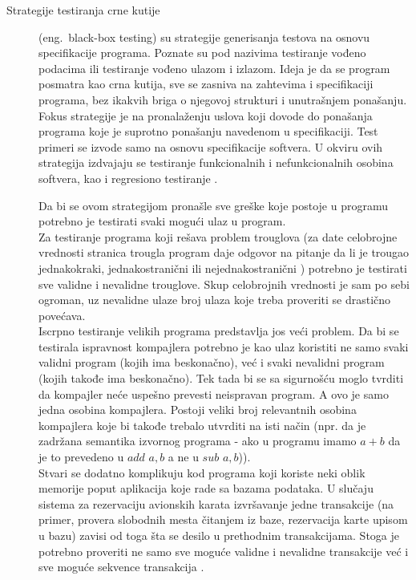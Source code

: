 \documentclass[12pt,oneside]{memoir}
\begin{document}
\begin{description}
\item [Strategije testiranja crne kutije] (eng.~black-box testing) su strategije generisanja testova na osnovu specifikacije programa. Poznate su pod nazivima testiranje vođeno podacima ili testiranje vođeno ulazom i izlazom. Ideja je da se program posmatra kao crna kutija, sve se zasniva na zahtevima i specifikaciji programa, bez ikakvih briga o njegovoj strukturi i unutrašnjem ponašanju. Fokus strategije je na pronalaženju uslova koji dovode do ponašanja programa koje je suprotno ponašanju navedenom u specifikaciji. Test primeri se izvode samo na osnovu specifikacije softvera. U okviru ovih strategija izdvajaju se testiranje funkcionalnih i nefunkcionalnih osobina softvera, kao i regresiono testiranje \cite{mvj, ArtOfST, PGtSTD}.

Da bi se ovom strategijom pronašle sve greške koje postoje u programu potrebno je testirati svaki mogući ulaz u program. \\
Za testiranje programa koji rešava problem trouglova (za date celobrojne vrednosti stranica trougla program daje odgovor na pitanje da li je trougao jednakokraki, jednakostranični ili nejednakostranični \cite{schlingloff} %
) potrebno je testirati sve validne i nevalidne trouglove. Skup celobrojnih vrednosti je sam po sebi ogroman, uz nevalidne ulaze broj ulaza koje treba proveriti se drastično povećava.\\
Iscrpno testiranje velikih programa predstavlja jos veći problem. Da bi se testirala ispravnost kompajlera potrebno je kao ulaz koristiti ne samo svaki validni program (kojih ima beskonačno), već i svaki nevalidni program (kojih takođe ima beskonačno). Tek tada bi se sa sigurnošću moglo tvrditi da kompajler neće uspešno prevesti neispravan program. A ovo je samo jedna osobina kompajlera. Postoji veliki broj relevantnih osobina kompajlera koje bi takođe trebalo utvrditi na isti način (npr. da je zadržana semantika izvornog programa - ako u programu imamo $a+b$ da je to prevedeno u $add$ $a, b$ a ne u $sub$ $a, b$)). \\
Stvari se dodatno komplikuju kod programa koji koriste neki oblik memorije poput aplikacija koje rade sa bazama podataka. U slučaju sistema za rezervaciju avionskih karata izvršavanje jedne transakcije (na primer, provera slobodnih mesta čitanjem iz baze, rezervacija karte upisom u bazu) zavisi od toga šta se desilo u prethodnim transakcijama. Stoga je potrebno proveriti ne samo sve moguće validne i nevalidne transakcije već i sve moguće sekvence transakcija \cite{ArtOfST}.


\end{description}
\end{document}
